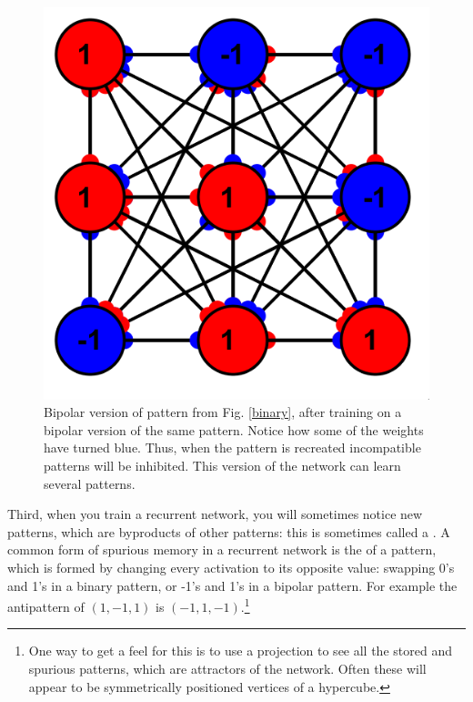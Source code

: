 \begin{figure}[h]
\centering
\includegraphics[scale=.6]{./images/hebb_bipolar_9.png}
\caption[Simbrain screenshot]{Bipolar version of pattern from Fig. \ref{binary}, after training on a bipolar version of the same pattern. Notice how some of the weights have turned blue. Thus, when the pattern is recreated incompatible patterns will be inhibited. This version of the network can learn several patterns.}
\label{bipolar}
\end{figure}

Third, when you train a recurrent network, you will sometimes notice new patterns, which are byproducts of other patterns: this is sometimes called a . A common form of spurious memory in a recurrent network is the  of a pattern, which is formed by changing every activation to its opposite value: swapping 0's and 1's in a binary pattern, or -1's and 1's in a bipolar pattern. For example the antipattern of $(1,-1,1)$ is $(-1,1,-1)$.\footnote{One way to get a feel for this is to use a projection to see all the stored and spurious patterns, which are attractors of the network. Often these will appear to be symmetrically positioned vertices of a hypercube.} 

